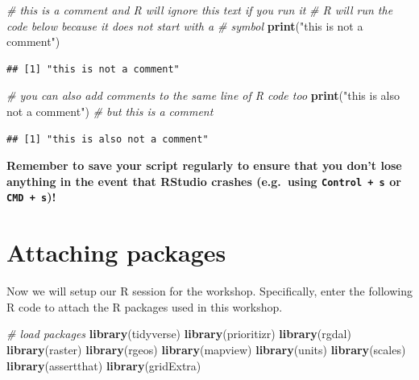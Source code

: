 \documentclass[12pt,]{book}
\newenvironment{Shaded}{\begin{snugshade}}{\end{snugshade}}
\newcommand{\KeywordTok}[1]{\textcolor[rgb]{0.13,0.29,0.53}{\textbf{#1}}}
\newcommand{\StringTok}[1]{\textcolor[rgb]{0.31,0.60,0.02}{#1}}
\newcommand{\CommentTok}[1]{\textcolor[rgb]{0.56,0.35,0.01}{\textit{#1}}}
\newcommand{\NormalTok}[1]{#1}
\begin{document}
\begin{Shaded}
\begin{Highlighting}[]
\CommentTok{# this is a comment and R will ignore this text if you run it}
\CommentTok{# R will run the code below because it does not start with a # symbol}
\KeywordTok{print}\NormalTok{(}\StringTok{"this is not a comment"}\NormalTok{)}
\end{Highlighting}
\end{Shaded}

\begin{verbatim}
## [1] "this is not a comment"
\end{verbatim}

\begin{Shaded}
\begin{Highlighting}[]
\CommentTok{# you can also add comments to the same line of R code too}
\KeywordTok{print}\NormalTok{(}\StringTok{"this is also not a comment"}\NormalTok{) }\CommentTok{# but this is a comment}
\end{Highlighting}
\end{Shaded}

\begin{verbatim}
## [1] "this is also not a comment"
\end{verbatim}

\textbf{Remember to save your script regularly to ensure that you don't
lose anything in the event that RStudio crashes (e.g.~using
\texttt{Control\ +\ s} or \texttt{CMD\ +\ s})!}

\section{Attaching packages}\label{attaching-packages}

Now we will setup our R session for the workshop. Specifically, enter
the following R code to attach the R packages used in this workshop.

\begin{Shaded}
\begin{Highlighting}[]
\CommentTok{# load packages}
\KeywordTok{library}\NormalTok{(tidyverse)}
\KeywordTok{library}\NormalTok{(prioritizr)}
\KeywordTok{library}\NormalTok{(rgdal)}
\KeywordTok{library}\NormalTok{(raster)}
\KeywordTok{library}\NormalTok{(rgeos)}
\KeywordTok{library}\NormalTok{(mapview)}
\KeywordTok{library}\NormalTok{(units)}
\KeywordTok{library}\NormalTok{(scales)}
\KeywordTok{library}\NormalTok{(assertthat)}
\KeywordTok{library}\NormalTok{(gridExtra)}
\end{Highlighting}
\end{Shaded}
\end{document}
